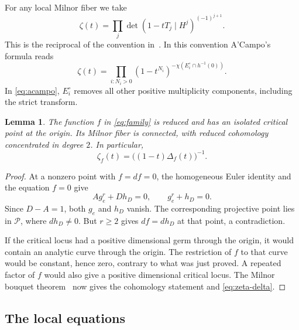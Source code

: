 \documentclass[11pt]{article}
\numberwithin{equation}{section}
\newtheorem{lemma}[theorem]{Lemma}
\theoremstyle{definition}
\theoremstyle{remark}
\begin{document}
For any local Milnor fiber we take
\begin{equation}\label{eq:zeta-convention}
 \zeta(t)=\prod_j\det(1-tT_j\mid H^j)^{(-1)^{j+1}}.
\end{equation}
This is the reciprocal of the convention in~\cite{GLM97}.
In this convention A'Campo's formula reads
\begin{equation}\label{eq:acampo}
 \zeta(t)=\prod_{i:N_i>0}(1-t^{N_i})^{
       -\chi(E_i^\circ\cap h^{-1}(0))}.
\end{equation}
In \eqref{eq:acampo}, $E_i^\circ$ removes all other positive
multiplicity components, including the strict transform.

\begin{lemma}\label{lem:isolated}
The function $f$ in \eqref{eq:family} is reduced and has an
isolated critical point at the origin. Its Milnor fiber is
connected, with reduced cohomology concentrated in degree $2$.
In particular,
\begin{equation}\label{eq:zeta-delta}
 \zeta_f(t)=\bigl((1-t)\Delta_f(t)\bigr)^{-1}.
\end{equation}
\end{lemma}

\begin{proof}
At a nonzero point with $f=df=0$, the homogeneous Euler identity
and the equation $f=0$ give
\[
 A g_e^r+D h_D=0,\qquad g_e^r+h_D=0.
\]
Since $D-A=1$, both $g_e$ and $h_D$ vanish. The corresponding
projective point lies in $\mathcal P$, where $dh_D\ne0$.
But $r\ge2$ gives $df=dh_D$ at that point, a contradiction.

If the critical locus had a positive dimensional germ through
the origin, it would contain an analytic curve through the
origin. The restriction of $f$ to that curve would be constant,
hence zero, contrary to what was just proved. A repeated
factor of $f$ would also give a positive dimensional critical
locus. The Milnor bouquet theorem~\cite{Mil68} now gives the
cohomology statement and \eqref{eq:zeta-delta}.
\end{proof}

\subsection{The local equations}
\end{document}
